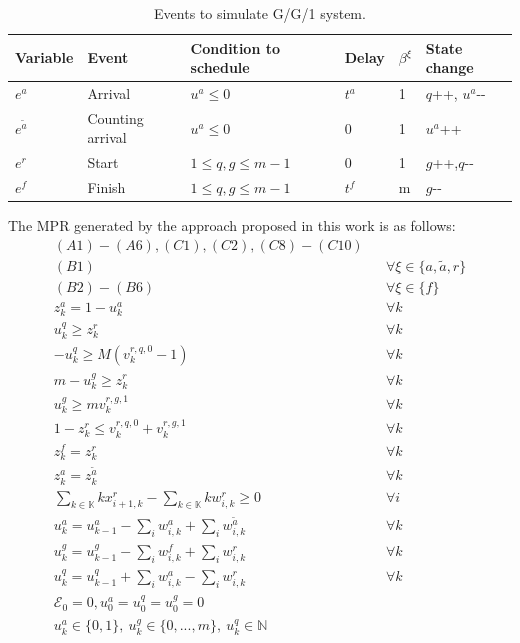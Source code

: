 \documentclass[]{interact}
\theoremstyle{plain}%
\theoremstyle{definition}
\theoremstyle{remark}
\begin{document}
\begin{table}[h]
	\begin{tabular}{|llllll|}\hline
		Variable&Event & Condition to schedule & Delay&$\beta^{\xi}$& State change\\\hline
		$e^{a}$& Arrival & $u^a\le0$ & $t^a$&1& $q${\footnotesize++}, $u^a${\small-}{\small-} \\\hline
		$e^{\tilde{a}}$& Counting arrival & $u^a\le0$ & $0$ &1& $u^a${\footnotesize++} \\\hline
		$e^{r}$& Start 	& $1\le q, g\le m-1$ & $0$&1& $g${\footnotesize++},$q${\small-}{\small-}  \\\hline
		$e^{f}$& Finish & $1\le q, g\le m-1$ & $t^{f}$ &m& $g${\small-}{\small-} \\\hline
	\end{tabular}
	\caption{Events to simulate G/G/1 system.}
	\label{tab:gg1}
\end{table}

The MPR generated by the approach proposed in this work is as follows: 
\begin{eqnarray}
(A1)-(A6),(C1),(C2),(C8)-(C10)\nonumber\\
(B1) && \forall \xi \in\{a,\tilde{a},r\}\nonumber\\
(B2) - (B6) && \forall \xi \in\{f\}\nonumber\\
z^{a}_{k} = 1-u^{a}_{k} &&\forall k \label{GG1:a1}\\
u^q_k \ge z^{r}_{k}&&\forall k \label{GG1:s1}\\
- u^q_k \ge M(v^{r,q,0}_k-1)&&\forall k \label{GG1:s2}\\
m-u^g_k \ge z^{r}_{k}&&\forall k \label{GG1:s3}\\
u^g_k  \ge mv^{r,g,1}_k&&\forall k \label{GG1:s4}\\
1 - z^{r}_{k} \le v^{r,q,0}_k +v^{r,g,1}_k&&\forall k \label{GG1:s7}\\
z^{f}_{k} = z^{r}_{k}&&\forall k \label{GG1:f1}\\
z^{a}_{k}  = z^{\tilde{a}}_{k} &&\forall k \label{GG1:a2}\\
\sum_{k\in \mathbb{K}} kx^{r}_{i+1,k} - \sum_{k\in \mathbb{K}} kw^{r}_{i,k} \ge 0&&\forall i\label{GG1:s8}\\
u^{a}_k = u^{a}_{k-1} - \sum_{i}w^{a}_{i,k} + \sum_{i} w^{\tilde{a}}_{i,k} &&\forall k \label{GG1:E1}\\
u^{g}_k = u^{g}_{k-1} -  \sum_{i}w^{f}_{i,k} + \sum_{i} w^{r}_{i,k} &&\forall k \label{GG1:E4}\\
u^{q}_k = u^{q}_{k-1} +  \sum_{i}w^{a}_{i,k} -  \sum_{i}w^{r}_{i,k}&&\forall k \label{GG1:E5}\\
\mathcal{E}_0 = 0, u^a_0=u^q_0=u^g_0=0\nonumber\\
u^{a}_{k}\in\{0,1\},\ u^g_{k}\in\{0,...,m\},\ u^{q}_k\in \mathbb{N}
\end{eqnarray}
\end{document}
